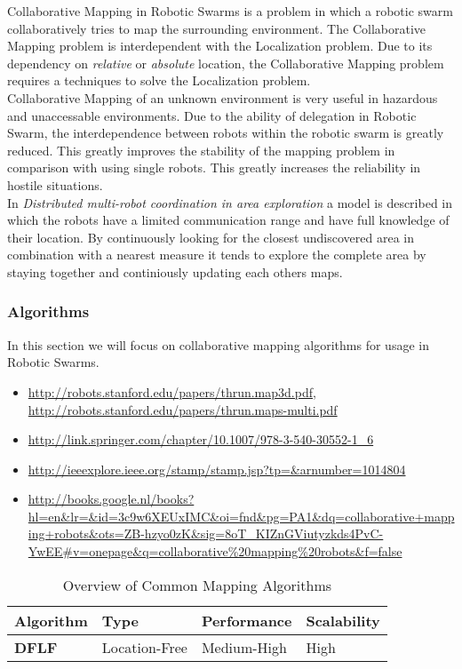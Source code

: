 Collaborative Mapping in Robotic Swarms is a problem in which a robotic swarm collaboratively tries to map the surrounding environment. 
The Collaborative Mapping problem is interdependent with the Localization problem. Due to its dependency on \emph{relative} or \emph{absolute} location, the Collaborative Mapping problem requires a techniques to solve the Localization problem.\\

Collaborative Mapping of an unknown environment is very useful in hazardous and unaccessable environments.\cite{hardin2004modified}
Due to the ability of delegation in Robotic Swarm, the interdependence between robots within the robotic swarm is greatly reduced.
This greatly improves the stability of the mapping problem in comparison with using single robots. This greatly increases the reliability in hostile situations.\\

In \emph{Distributed multi-robot coordination in area exploration} \cite{sheng2006distributed} a model is described in which the robots have a limited communication range and have full knowledge of their location.
By continuously looking for the closest undiscovered area in combination with a nearest measure it tends to explore the complete area by staying together and continiously updating each others maps.

\subsubsection{Algorithms}
In this section we will focus on collaborative mapping algorithms for usage in Robotic Swarms.

\begin{itemize}
  \item \url{http://robots.stanford.edu/papers/thrun.map3d.pdf}, \url{http://robots.stanford.edu/papers/thrun.maps-multi.pdf}
  \item \url{http://link.springer.com/chapter/10.1007/978-3-540-30552-1_6}
  \item \url{http://ieeexplore.ieee.org/stamp/stamp.jsp?tp=&arnumber=1014804}
  \item \url{http://books.google.nl/books?hl=en&lr=&id=3c9w6XEUxIMC&oi=fnd&pg=PA1&dq=collaborative+mapping+robots&ots=ZB-hzyo0zK&sig=8oT_KIZnGViutyzkds4PvC-YwEE#v=onepage&q=collaborative%20mapping%20robots&f=false}
\end{itemize}

  \begin{table}[H]
  \renewcommand{\arraystretch}{1.3}
  \label{table_alg_mapping}
  \caption{Overview of Common Mapping Algorithms}
  \centering
    \begin{tabular}{|l|l|l|l|}
    \hline
    \bfseries Algorithm & \bfseries Type & \bfseries Performance & \bfseries Scalability\\
    \hline
    \bfseries DFLF& Location-Free & Medium-High & High\\\hline
    \end{tabular}
  \end{table}

